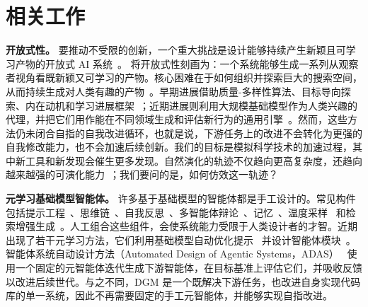 \documentclass[10pt,twocolumn]{article}
\begin{document}
\section{相关工作}
\label{sec:related}

\textbf{开放式性。}
要推动不受限的创新，一个重大挑战是设计能够持续产生新颖且可学习产物的开放式 AI 系统~\citep{stanley2017open}。\citet{hughes2024open} 将开放式性刻画为：一个系统能够生成一系列从观察者视角看既新颖又可学习的产物。核心困难在于如何组织并探索巨大的搜索空间，从而持续生成对人类有趣的产物~\citep{clune2019ai,jiang2023general}。早期进展借助质量-多样性算法、目标导向探索、内在动机和学习进展框架~\citep{pugh2016quality,ecoffet2019go,lehman2011novelty,oudeyer2007intrinsic}；近期进展则利用大规模基础模型作为人类兴趣的代理，并把它们用作能在不同领域生成和评估新行为的通用引擎~\citep{brown2020language,hu2025automated,zhang2024omni}。然而，这些方法仍未闭合自指的自我改进循环，也就是说，下游任务上的改进不会转化为更强的自我修改能力，也不会加速后续创新。我们的目标是模拟科学技术的加速过程，其中新工具和新发现会催生更多发现。自然演化的轨迹不仅趋向更高复杂度，还趋向越来越强的可演化能力~\citep{dawkins2019evolution,gerhart2007theory,hendrikse2007evolvability}；我们要问的是，如何仿效这一轨迹？

\textbf{元学习基础模型智能体。}
许多基于基础模型的智能体都是手工设计的。常见构件包括提示工程~\citep{chen2023unleashing,schulhoff2024prompt}、思维链~\citep{wei2022chain,yao2023react,hu2023ThoughtCloning,guo2025deepseek,lightman2023let,muennighoff2025s1,zelikman2024quiet}、自我反思~\citep{shinn2023reflexion,yao2023react,madaan2303self}、多智能体辩论~\citep{zhuge2023mindstorms,liang2023encouraging,khan2024debating}、记忆~\citep{liu2023think,zhong2024memorybank,modarressi2023ret}、温度采样~\citep{zhu2024hot} 和检索增强生成~\citep{lewis2020retrieval}。人工组合这些组件，会使系统能力受限于人类设计者的才智。近期出现了若干元学习方法，它们利用基础模型自动优化提示~\citep{fernandopromptbreeder,meta2022human,khattab2023dspy,cheng2025trace,yuksekgonul2024textgrad,yuan2024evoagent} 并设计智能体模块~\citep{zhang2024aflow,zhou2024symbolic,yin2024g,zhugegptswarm,rosser2025agentbreeder,zhang2025multi,ye2025mas,gao2025flowreasoner,nie2025weak,su2025debflow,zhang2025gnns,niu2025flow}。智能体系统自动设计方法（Automated Design of Agentic Systems，ADAS）~\citep{hu2025automated} 使用一个固定的元智能体迭代生成下游智能体，在目标基准上评估它们，并吸收反馈以改进后续世代。与之不同，DGM 是一个既解决下游任务，也改进自身实现代码库的单一系统，因此不再需要固定的手工元智能体，并能够实现自指改进。
\end{document}
